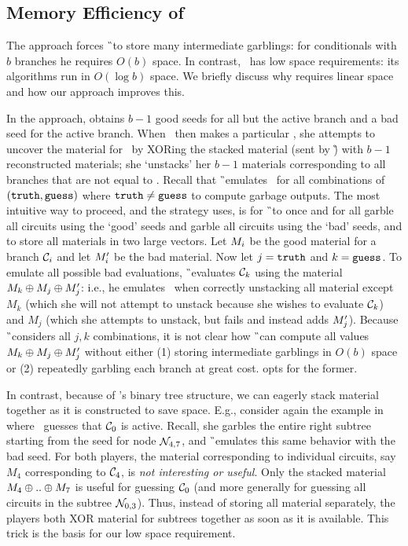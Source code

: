 \subsection{Memory Efficiency of \ourschemelong}
\label{sec:memoryEfficiency}

The \HK approach forces \G\ to store many intermediate
garblings: for conditionals with $b$ branches he requires $O(b)$ space.
In contrast, \ourschemelong\ has low space requirements: its
algorithms run in $O(\log b)$ space.
%
We briefly discuss why \HK requires linear space and how our approach
improves this.

In the \HK approach, \E obtains $b-1$ good seeds for all but the
active branch and a bad seed for the active branch.
%
When \E\ then makes a particular \guess, she attempts to uncover the
material for \guess\ by XORing the stacked material (sent by \G) with
$b-1$ reconstructed materials; she `unstacks' her $b-1$ materials
corresponding to all branches that are not equal to \guess.
%
Recall that \G\ emulates \E\ for all combinations of $(\mathtt{truth},
\mathtt{guess})$ where $\mathtt{truth} \neq \mathtt{guess}$ to compute garbage outputs.
%
The most intuitive way to proceed, and the strategy \HK uses,
is for \G\ to once and for all garble all circuits using the `good'
seeds and garble all circuits using the `bad' seeds, and to
store all materials in two large vectors.
Let $M_i$ be the good material for a branch $\mathcal C_i$ and let $M'_i$ be
the bad material.
%
Now let $j = \mathtt{truth}$ and $k = \mathtt{guess}$.
To emulate all possible bad evaluations, \G\ evaluates $\mathcal C_k$
using the material $M_k \oplus M_j \oplus M_j'$:
i.e., he emulates \E\ when correctly unstacking all material except $M_k$
(which she will not attempt to unstack because she wishes to
evaluate $\mathcal C_k$) and $M_j$ (which she attempts to unstack, but fails
and instead adds $M_j'$).
%
Because \G\ considers all $j, k$ combinations, it is not
clear how \G\ can compute all values $M_k \oplus M_j \oplus
M_j'$ without either (1) storing intermediate garblings in
$O(b)$ space or (2) repeatedly garbling each branch at great cost.
\HK opts for the former.

In contrast, because of \ourschemelong's binary tree
structure, we can eagerly stack material together as it is constructed
to save space.
%
E.g., consider again the example in  where
\E\ guesses that $\mathcal C_0$ is active.
%
Recall, she garbles the entire right subtree starting from the
seed for node $\mathtt{\cal N}_{4, 7}$, and \G\ emulates this same behavior with
the bad seed.
%
For both players, the material corresponding to individual circuits, say
$M_4$ corresponding to $\mathcal C_4$, is \emph{not interesting or useful}.
Only the stacked material $M_4 \oplus .. \oplus M_7$ is useful for
guessing $\mathcal C_0$ (and more generally for guessing all circuits in the subtree
$\mathtt{\cal N}_{0, 3}$).
Thus, instead of storing all material separately, the players both XOR
material for subtrees together as soon as it is available.
This trick is the basis for our low space requirement.

